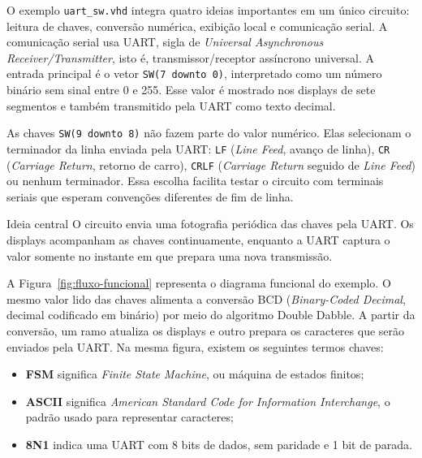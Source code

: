 \documentclass[12pt,a4paper]{book}
\begin{document}
O exemplo \texttt{uart\_sw.vhd} integra quatro ideias importantes em um único circuito: leitura de chaves, conversão numérica, exibição local e comunicação serial. A comunicação serial usa UART, sigla de \textit{Universal Asynchronous Receiver/Transmitter}, isto é, transmissor/receptor assíncrono universal. A entrada principal é o vetor \texttt{SW(7 downto 0)}, interpretado como um número binário sem sinal entre 0 e 255. Esse valor é mostrado nos displays de sete segmentos e também transmitido pela UART como texto decimal.

As chaves \texttt{SW(9 downto 8)} não fazem parte do valor numérico. Elas selecionam o terminador da linha enviada pela UART: \texttt{LF} (\textit{Line Feed}, avanço de linha), \texttt{CR} (\textit{Carriage Return}, retorno de carro), \texttt{CRLF} (\textit{Carriage Return} seguido de \textit{Line Feed}) ou nenhum terminador. Essa escolha facilita testar o circuito com terminais seriais que esperam convenções diferentes de fim de linha.

\begin{observacao}{Ideia central}
O circuito envia uma fotografia periódica das chaves pela UART. Os displays acompanham as chaves continuamente, enquanto a UART captura o valor somente no instante em que prepara uma nova transmissão.
\end{observacao}

A Figura~\ref{fig:fluxo-funcional} representa o diagrama funcional do exemplo. O mesmo valor lido das chaves alimenta a conversão BCD (\textit{Binary-Coded Decimal}, decimal codificado em binário) por meio do algoritmo Double Dabble. A partir da conversão, um ramo atualiza os displays e outro prepara os caracteres que serão enviados pela UART. Na mesma figura, existem os seguintes termos chaves:

\begin{itemize}
  \item \textbf{FSM} significa \textit{Finite State Machine}, ou máquina de estados finitos;
  \item \textbf{ASCII} significa \textit{American Standard Code for Information Interchange}, o padrão usado para representar caracteres;
  \item \textbf{8N1} indica uma UART com 8 bits de dados, sem paridade e 1 bit de parada.
\end{itemize}
\end{document}
